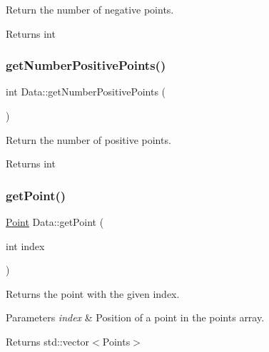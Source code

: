 Return the number of negative points. 

\begin{DoxyReturn}{Returns}
int 
\end{DoxyReturn}
\mbox{\label{class_data_a45a39ab2144bcdd0ac1aa67d7d08a6cc}} 
\subsubsection{\texorpdfstring{get\+Number\+Positive\+Points()}{getNumberPositivePoints()}}
{\footnotesize\ttfamily int Data\+::get\+Number\+Positive\+Points (\begin{DoxyParamCaption}{ }\end{DoxyParamCaption})}



Return the number of positive points. 

\begin{DoxyReturn}{Returns}
int 
\end{DoxyReturn}
\mbox{\label{class_data_a8cc66e410f7288913204585f215b786d}} 
\subsubsection{\texorpdfstring{get\+Point()}{getPoint()}}
{\footnotesize\ttfamily \hyperlink{class_point}{Point} Data\+::get\+Point (\begin{DoxyParamCaption}\item[{int}]{index }\end{DoxyParamCaption})}



Returns the point with the given index. 


\begin{DoxyParams}{Parameters}
{\em index} & Position of a point in the points array. \\
\hline
\end{DoxyParams}
\begin{DoxyReturn}{Returns}
std\+::vector$<$\+Points$>$ 
\end{DoxyReturn}
\mbox{\label{class_data_a8fe9ce813848765a7615b909c4654b55}} 
